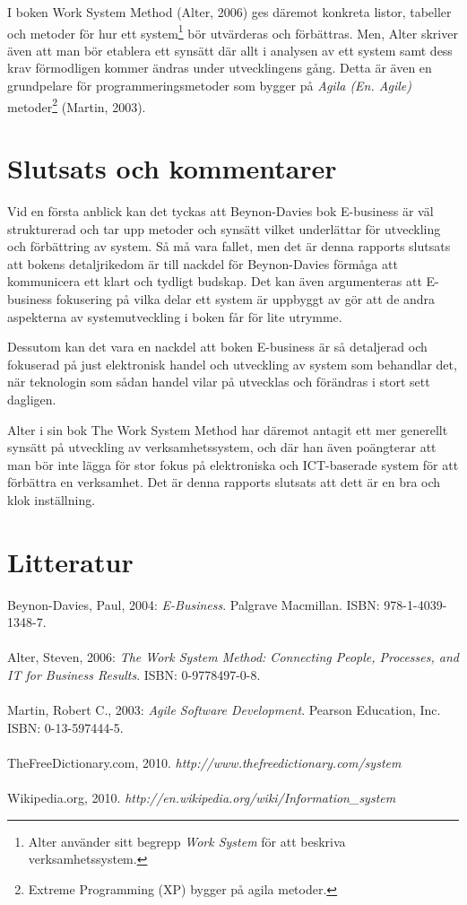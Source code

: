 \documentclass[12pt,a4paper,titlepage]{article}
\begin{document}
I boken Work System Method (Alter, 2006) ges däremot konkreta listor, tabeller och metoder för hur ett system\footnote{Alter använder sitt begrepp \textit{Work System} för att beskriva verksamhetssystem.} bör utvärderas och förbättras. Men, Alter skriver även att man bör etablera ett synsätt där allt i analysen av ett system samt dess krav förmodligen kommer ändras under utvecklingens gång. Detta är även en grundpelare för programmeringsmetoder som bygger på \textit{Agila (En. Agile)} metoder\footnote{Extreme Programming (XP) bygger på agila metoder.} (Martin, 2003).

\section{\textsf{Slutsats och kommentarer}}
Vid en första anblick kan det tyckas att Beynon-Davies bok E-business är väl strukturerad och tar upp metoder och synsätt vilket underlättar för utveckling och förbättring av system. Så må vara fallet, men det är denna rapports slutsats att bokens detaljrikedom är till nackdel för Beynon-Davies förmåga att kommunicera ett klart och tydligt budskap. Det kan även argumenteras att E-business fokusering på vilka delar ett system är uppbyggt av gör att de andra aspekterna av systemutveckling i boken får för lite utrymme. 

Dessutom kan det vara en nackdel att boken E-business är så detaljerad och fokuserad på just elektronisk handel och utveckling av system som behandlar det, när teknologin som sådan handel vilar på utvecklas och förändras i stort sett dagligen.

Alter i sin bok The Work System Method har däremot antagit ett mer generellt synsätt på utveckling av verksamhetssystem, och där han även poängterar att man bör inte lägga för stor fokus på elektroniska och ICT-baserade system för att förbättra en verksamhet. Det är denna rapports slutsats att dett är en bra och klok inställning.



\section*{\textsf{Litteratur}}
Beynon-Davies, Paul, 2004: \textit{E-Business}. 
Palgrave Macmillan. 
ISBN: 978-1-4039-1348-7.
\\
\\
Alter, Steven, 2006: \textit{The Work System Method: Connecting People, Processes, and IT for Business Results}.
ISBN: 0-9778497-0-8.
\\
\\
Martin, Robert C., 2003: \textit{Agile Software Development}.
Pearson Education, Inc.
ISBN: 0-13-597444-5.
\\
\\
TheFreeDictionary.com, 2010. \textit{http://www.thefreedictionary.com/system}
\\
\\
Wikipedia.org, 2010. \textit{http://en.wikipedia.org/wiki/Information\_system}

\appendix

\end{document}
